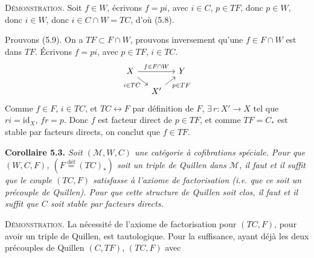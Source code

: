 \documentclass[11pt]{article}
\newcommand{\msp}[1]{\marginpar{\footnotesize [#1]}}
\newcommand{\defeq}{\overset{\text{déf}}{=}}
\begin{document}
\textsc{Démonstration}. Soit $f \in W$, écrivons $f = pi$, avec $i \in C$, $p \in TF$, donc $p \in W$, donc $i \in W$, donc $i \in C \cap W = TC$, d'où (5.8).

Prouvons (5.9). On a $TF \subset F \cap W$, prouvons inversement qu'une $f \in F \cap W$ est dans $TF$. Écrivons $f = pi$, avec $p \in TF$, $i \in TC$.
\[
\begin{tikzcd}[column sep=small, row sep=small]
X \arrow[rr, "f\in F\cap W"] \arrow[dr, "i\in TC"'] & & Y \\
& X' \arrow[ur, "p\in TF"'] &
\end{tikzcd}
\]
Comme $f \in F$, $i \in TC$, et $TC \longleftrightarrow F$ par définition de $F$, $\exists\, r : X' \longrightarrow X$ tel que $ri = \mathrm{id}_X$, $fr = p$. Donc $f$ est facteur direct de $p \in TF$, et comme $TF = C_{*}$ est stable par facteurs directs, on conclut que $f \in TF$.

\textbf{Corollaire 5.3.} \textit{Soit $(\mathcal{M}, W, C)$ une catégorie à cofibrations spéciale. Pour que $(W, C, F)$, $(F \defeq (TC)_{*})$ soit un triple de Quillen dans $\mathcal{M}$, il faut et il suffit que le couple $(TC, F)$ satisfasse à l'axiome de factorisation (i.e. que ce soit un précouple de Quillen). Pour que cette structure de Quillen soit clos, il faut et il suffit que $C$ soit stable par facteurs directs.} %

\msp{page 88}

\textsc{Démonstration}. La nécessité de l'axiome de factorisation pour $(TC, F)$, pour avoir un triple de Quillen, est tautologique. Pour la suffisance, ayant déjà les deux précouples de Quillen $(C, TF)$, $(TC, F)$ avec
\end{document}
